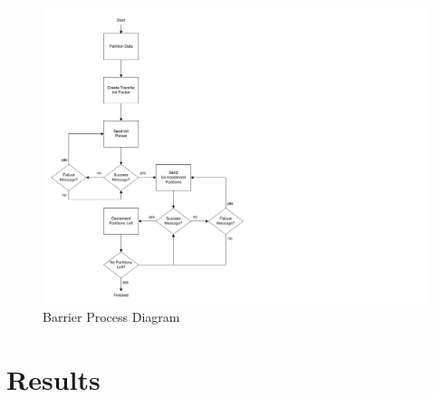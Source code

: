 \begin{figure}[ptb]
	\begin{centering}
		\includegraphics{API/Figures/api-send_process_diagram.pdf}
		\caption{Barrier Process Diagram}
		\label{fig:api:barrier_process_diagram}
	\end{centering}
\end{figure}

\section{Results}\label{sec:api:results}

